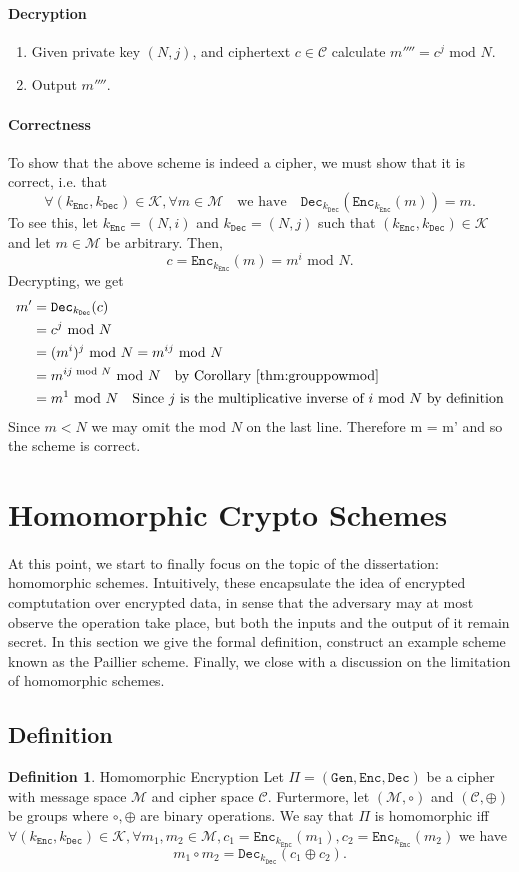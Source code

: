 \documentclass{article}
\theoremstyle{definition}
\newtheorem{definition}{Definition}[section]
\newcommand{\Enc}{\texttt{Enc}}
\newcommand{\Dec}{\texttt{Dec}}
\newcommand{\Gen}{\texttt{Gen}}
\newcommand{\M}{\mathcal{M}}
\renewcommand{\C}{\mathcal{C}}
\newcommand{\K}{\mathcal{K}}
\renewcommand{\mod}{\,\,\text{mod}\,\,}
\begin{document}
\paragraph{Decryption}
\begin{enumerate}
\item Given private key $(N, j)$, and ciphertext $c \in \C$ calculate $m'''' = c^j \mod
  N$.
\item Output $m''''$.
\end{enumerate}
\paragraph{Correctness} To show that the above scheme is indeed a cipher, we
must show that it is correct, i.e. that
\[
  \forall (k_\Enc, k_\Dec) \in \K, \forall m \in \M\quad\text{we have}\quad
  \Dec_{k_\Dec}(\Enc_{k_\Enc}(m)) = m.
\]
To see this, let $k_\Enc = (N, i)$ and $k_\Dec = (N, j)$ such that $(k_\Enc,
k_\Dec) \in \K$ and let $m \in \M$ be arbitrary. Then,
\[
  c = \Enc_{k_\Enc}(m) = m^i \mod N.
\]
Decrypting, we get
\begin{align*}
  m' &= \Dec_{k_\Dec}(c) \\
     &= c^j \mod N \\
     &= (m^i)^j \mod N = m^{ij} \mod N \\
     &= m^{ij \mod N} \mod N \quad \text{by Corollary \ref{thm:grouppowmod}} \\
     &= m^1 \mod N \quad \text{Since $j$ is the multiplicative inverse of $i$ mod $N$ by definition}
\end{align*}
Since $m < N$ we may omit the mod $N$ on the last line. Therefore m = m' and so the scheme is correct.
\section{Homomorphic Crypto Schemes}
\paragraph{}
At this point, we start to finally focus on the topic of the dissertation:
homomorphic schemes. Intuitively, these encapsulate the idea of encrypted
comptutation over encrypted data, in sense that the adversary may at most
observe the operation take place, but both the inputs and the output of it
remain secret. In this section we give the formal definition, construct an
example scheme known as the Paillier scheme. Finally, we close with a discussion
on the limitation of homomorphic schemes.
\subsection{Definition}
\begin{definition}{Homomorphic Encryption}
  Let $\Pi = (\Gen, \Enc, \Dec)$ be a cipher with message space $\M$ and cipher
  space $\C$. Furtermore, let $(\M, \circ)$ and $(\C, \oplus)$ be groups where
  $\circ, \oplus$ are binary operations.
  We say that $\Pi$ is homomorphic iff $\forall (k_\Enc, k_\Dec) \in \K, \forall
  m_1, m_2 \in \M, c_1 = \Enc_{k_\Enc}(m_1), c_2 = \Enc_{k_\Enc}(m_2)$ we have
  \[
    m_1 \circ m_2 = \Dec_{k_\Dec}(c_1 \oplus c_2).
  \]
\end{definition}
\end{document}
